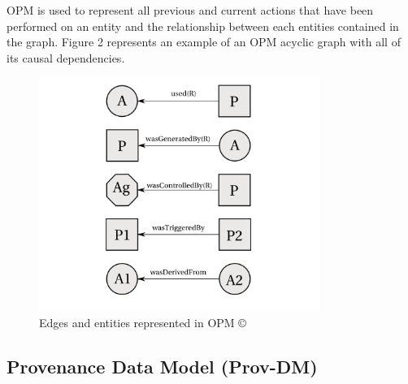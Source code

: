 OPM is used to represent all previous and current actions that have been performed on an entity and  the relationship between each entities contained in the graph. Figure 2 represents an example of an OPM acyclic graph with all of its causal dependencies.  

\begin{figure}[h]
\begin{center}
\includegraphics[height=3.0in]{opm_convention.PNG}
\end{center}
\caption{Edges and entities represented in OPM \copyright \cite{moreau_open_2011}}
\label{autom}
\end{figure}



\subsection{Provenance Data Model (Prov-DM)}


